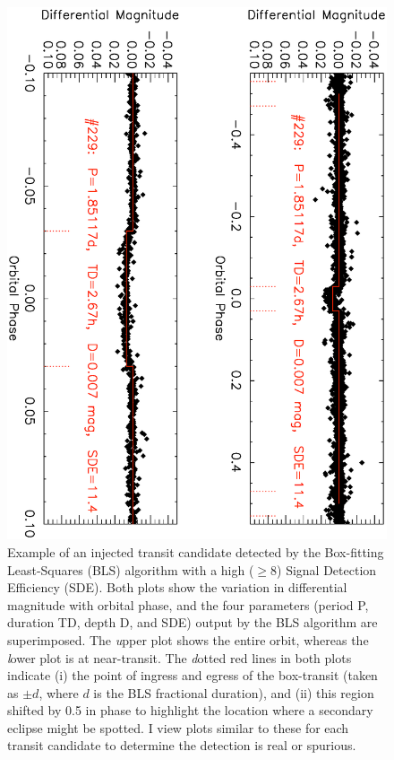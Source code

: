 \begin{figure}
\begin{center}
\centering
\includegraphics[width=.75\textwidth, angle=90]{7_highsde}
\caption[Example of an injected transit candidate with a high SDE]{%
Example of an injected transit candidate detected by the Box-fitting Least-Squares (BLS) algorithm with a high ($\geq$8) Signal Detection Efficiency (SDE).
Both plots show the variation in differential magnitude with orbital phase, and the four parameters (period P, duration TD, depth D, and SDE) output by the BLS algorithm are superimposed.
The {\textit upper} plot shows the entire orbit, whereas the {\textit lower} plot is at near-transit.
The {\textit dotted red lines} in both plots indicate (i) the point of ingress and egress of the box-transit (taken as $\pm d$, where $d$ is the BLS fractional duration), and (ii) this region shifted by 0.5 in phase to highlight the location where a secondary eclipse might be spotted.
I view plots similar to these for each transit candidate to determine the detection is real or spurious.%
}\label{cha:human:sec:model:fig:highsde}
\end{center}
\end{figure}

